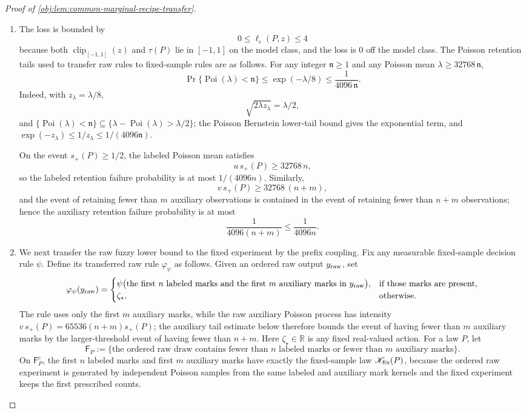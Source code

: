 \begin{proof}[Proof of \cref{obj:lem:common-marginal-recipe-transfer}]
\begin{enumerate}
\item The loss is bounded by
\[
0\le \ell_\epsilon(P,z)\le 4
\]
because both \(\operatorname{clip}_{[-1,1]}(z)\) and \(\tau(P)\) lie in \([-1,1]\) on the model class, and the loss is \(0\) off the model class.  The Poisson retention tails used to transfer raw rules to fixed-sample rules are as follows.  For any integer \(\mathfrak n\ge1\) and any Poisson mean \(\lambda\ge32768\,\mathfrak n\),
\[
\Pr\{\operatorname{Poi}(\lambda)<\mathfrak n\}
\le
\exp(-\lambda/8)
\le
\frac1{4096\,\mathfrak n}.
\]
Indeed, with \(z_\lambda=\lambda/8\),
\[
\sqrt{2\lambda z_\lambda}=\lambda/2,
\]
and \(\{\operatorname{Poi}(\lambda)<\mathfrak n\}\subseteq
\{\lambda-\operatorname{Poi}(\lambda)>\lambda/2\}\); the Poisson Bernstein lower-tail bound gives the exponential term, and \(\exp(-z_\lambda)\le 1/z_\lambda\le1/(4096\mathfrak n)\).

On the event \(s_+(P)\ge1/2\), the labeled Poisson mean satisfies
\[
u\,s_+(P)\ge 32768\,n,
\]
so the labeled retention failure probability is at most \(1/(4096n)\).  Similarly,
\[
v\,s_+(P)\ge 32768\,(n+m),
\]
and the event of retaining fewer than \(m\) auxiliary observations is contained in the event of retaining fewer than \(n+m\) observations; hence the auxiliary retention failure probability is at most
\[
\frac1{4096(n+m)}\le \frac1{4096n}.
\] %

\item We next transfer the raw fuzzy lower bound to the fixed experiment by the prefix coupling.  Fix any measurable fixed-sample decision rule \(\psi\).  Define its transferred raw rule \(\varphi_\psi\) as follows.  Given an ordered raw output \(y_{\rm raw}\), set
\[
\varphi_\psi(y_{\rm raw})
=
\begin{cases}
\psi\bigl(\text{the first \(n\) labeled marks and the first \(m\) auxiliary marks in \(y_{\rm raw}\)}\bigr),
& \text{if those marks are present},\\
\zeta_\star,& \text{otherwise}.
\end{cases}
\]
The rule uses only the first \(m\) auxiliary marks, while the raw auxiliary Poisson process has intensity \(v\,s_+(P)=65536(n+m)s_+(P)\); the auxiliary tail estimate below therefore bounds the event of having fewer than \(m\) auxiliary marks by the larger-threshold event of having fewer than \(n+m\).  Here \(\zeta_\star\in\mathbb R\) is any fixed real-valued action.  For a law \(P\), let
\[
\mathsf F_P
:=
\bigl\{\text{the ordered raw draw contains fewer than \(n\) labeled marks or fewer than \(m\) auxiliary marks}\bigr\}.
\]
On \(\mathsf F_P^c\), the first \(n\) labeled marks and first \(m\) auxiliary marks have exactly the fixed-sample law \(\mathscr K_{\rm fix}(P)\), because the ordered raw experiment is generated by independent Poisson samples from the same labeled and auxiliary mark kernels and the fixed experiment keeps the first prescribed counts.


\end{enumerate}
\end{proof}
